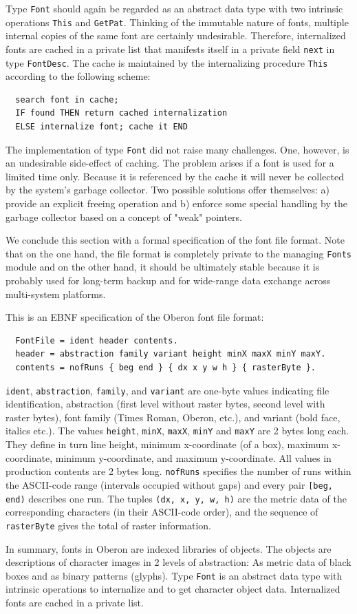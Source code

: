Type \verb|Font| should again be regarded as an abstract data type with two intrinsic operations
\verb|This| and \verb|GetPat|. Thinking of the immutable nature of fonts, multiple internal copies
of the same font are certainly undesirable. Therefore, internalized fonts are cached in a private list
that manifests itself in a private field \verb|next| in type \verb|FontDesc|. The cache is maintained
by the internalizing procedure \verb|This| according to the following scheme:
\begin{verbatim}
  search font in cache;
  IF found THEN return cached internalization
  ELSE internalize font; cache it END
\end{verbatim}
The implementation of type \verb|Font| did not raise many challenges. One, however, is an undesirable
side-effect of caching. The problem arises if a font is used for a limited time only. Because it is
referenced by the cache it will never be collected by the system's garbage collector. Two possible
solutions offer themselves: a) provide an explicit freeing operation and b) enforce some special
handling by the garbage collector based on a concept of "weak" pointers.

We conclude this section with a formal specification of the font file format. Note that on the one
hand, the file format is completely private to the managing \verb|Fonts| module and on the other hand,
it should be ultimately stable because it is probably used for long-term backup and for wide-range
data exchange across multi-system platforms.

This is an EBNF specification of the Oberon font file format:
\begin{verbatim}
  FontFile = ident header contents.
  header = abstraction family variant height minX maxX minY maxY.
  contents = nofRuns { beg end } { dx x y w h } { rasterByte }.
\end{verbatim}
\verb|ident|, \verb|abstraction|, \verb|family|, and \verb|variant| are one-byte values indicating
file identification, abstraction (first level without raster bytes, second level with raster bytes),
font family (Times Roman, Oberon, etc.), and variant (bold face, italics etc.). The values
\verb|height|, \verb|minX|, \verb|maxX|, \verb|minY| and \verb|maxY| are 2 bytes long each.
They define in turn line height, minimum x-coordinate (of a box), maximum x-coordinate, minimum
y-coordinate, and maximum y-coordinate. All values in production contents are 2 bytes long.
\verb|nofRuns| specifies the number of runs within the ASCII-code range (intervals occupied without
gaps) and every pair \verb|[beg, end)| describes one run. The tuples \verb|(dx, x, y, w, h)| are
the metric data of the corresponding characters (in their ASCII-code order), and the sequence of
\verb|rasterByte| gives the total of raster information.

In summary, fonts in Oberon are indexed libraries of objects. The objects are descriptions of
character images in 2 levels of abstraction: As metric data of black boxes and as binary patterns
(glyphs). Type \verb|Font| is an abstract data type with intrinsic operations to internalize and
to get character object data. Internalized fonts are cached in a private list.
